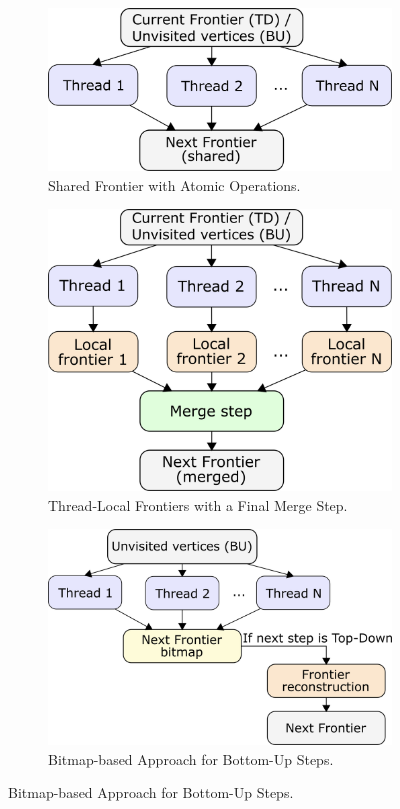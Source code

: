 \begin{figure}[h!]
    \centering

    \begin{subfigure}[c]{0.54\textwidth}
        \centering
        \includegraphics[width=0.8\linewidth]{images/parallelization_shared.png}
        \caption{Shared Frontier with Atomic Operations.}
        \label{fig:paral_shared}
    \end{subfigure}
    
    \vspace{0.5cm}
    
    \begin{subfigure}[c]{0.48\textwidth}
        \centering
        \includegraphics[width=0.8\linewidth]{images/parallelization_merged.png}
        \caption{Thread-Local Frontiers with a Final Merge Step.}
        \label{fig:paral_merged}
    \end{subfigure}
    \begin{subfigure}[c]{0.48\textwidth}
        \centering
        \includegraphics[width=0.9\linewidth]{images/parallelization_bottomup.png}
        \caption{Bitmap-based Approach for Bottom-Up Steps.}
        \label{fig:paral_bottomup}
    \end{subfigure}


\end{figure}
